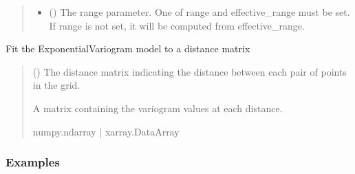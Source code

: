 \documentclass[letterpaper,10pt,english]{sphinxmanual}
\begin{document}
\begin{fulllineitems}
\begin{quote}
\begin{description}
\begin{itemize}
\item {}
\sphinxAtStartPar
{} (\sphinxstyleliteralemphasis{\sphinxupquote{ | }}\sphinxstyleliteralemphasis{\sphinxupquote{ | }}) \textendash{} The range parameter. One of range and effective\_range must be set. If
range is not set, it will be computed from effective\_range.

\end{itemize}

\end{description}\end{quote}

\begin{fulllineitems}
\label{\detokenize{covariance:glomar_gridding.variogram.ExponentialVariogram.fit}}
\pysigstartsignatures
\pysiglinewithargsret
{}
{}
{}
\pysigstopsignatures
\sphinxAtStartPar
Fit the ExponentialVariogram model to a distance matrix
\begin{quote}\begin{description}
\sphinxAtStartPar
{} (\sphinxstyleliteralemphasis{\sphinxupquote{ | }}) \textendash{} The distance matrix indicating the distance between each pair of
points in the grid.

\sphinxAtStartPar
A matrix containing the variogram values at each distance.

\sphinxAtStartPar
numpy.ndarray | xarray.DataArray

\end{description}\end{quote}
\subsubsection*{Examples}

\begin{sphinxVerbatim}[commandchars=\\\{\}]
  
\end{sphinxVerbatim}

\end{fulllineitems}


\end{fulllineitems}
\end{document}
